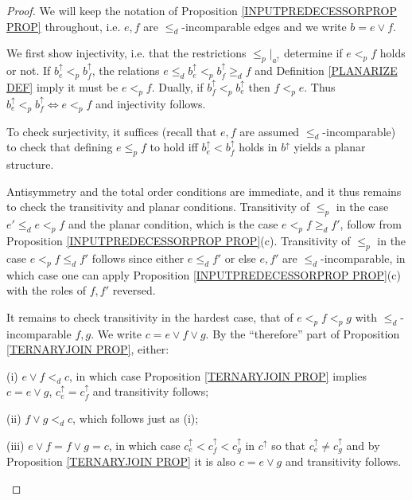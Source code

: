 \documentclass[a4paper,10pt
,draft
]{article}%
\numberwithin{equation}{section}
\numberwithin{figure}{section}
\theoremstyle{definition} %
\newcommand{\1}{\ensuremath{\mathbbm 1}}%
\begin{document}
\begin{proof}
We will keep the notation of Proposition \ref{INPUTPREDECESSORPROP PROP} throughout,
i.e. $e, f$ are $\leq_d$-incomparable edges and we write $b = e \vee f$. 

	We first show injectivity,
	i.e. that the restrictions $\leq_p|_{a^{\uparrow}}$ determine if 
	$e <_p f$ holds or not.
If $b^{\uparrow}_e <_p b^{\uparrow}_f$, the relations
$e \leq_d b^{\uparrow}_e <_p b^{\uparrow}_f \geq_d f$
and Definition \ref{PLANARIZE DEF} imply it must be $e <_p f$.
Dually, if $b^{\uparrow}_f <_p b^{\uparrow}_e$ then 
$f <_p e$. Thus 
$b^{\uparrow}_e <_p b^{\uparrow}_f \Leftrightarrow e <_p f$ and injectivity follows.

To check surjectivity, 
 it suffices (recall that $e,f$ are assumed $\leq_d$-incomparable) to check that
defining $e \leq_p f$ to hold iff $b^{\uparrow}_e < b^{\uparrow}_f$ holds in $b^{\uparrow}$ yields a planar structure.

Antisymmetry and the total order conditions are immediate, and it thus remains to check the transitivity and planar conditions.
Transitivity of $\leq_p$ in the case $e' \leq_d e <_p f$ and the planar condition, which is the case $e <_p f \geq_d f'$, follow from Proposition \ref{INPUTPREDECESSORPROP PROP}(c). Transitivity of $\leq_p$ in the case $e <_p f \leq_d f'$
follows since either $e \leq_d f'$ or else $e,f'$ are $\leq_d$-incomparable, in which case one can apply Proposition \ref{INPUTPREDECESSORPROP PROP}(c) with the roles of $f,f'$ reversed.

It remains to check transitivity in the hardest case, that of 
$e <_p f <_p g$ with $\leq_d$-incomparable $f,g$.
We write $c = e \vee f \vee g$.
By the ``therefore'' part of Proposition \ref{TERNARYJOIN PROP}, either:
\begin{inparaenum}
	\item[(i)] $e \vee f <_d c$, in which case 
	Proposition \ref{TERNARYJOIN PROP}
	implies 
	$c=e \vee g$,
	$c^{\uparrow}_e = c^{\uparrow}_f$ and transitivity follows;
	\item[(ii)] $f \vee g <_d c$, which follows just as (i);
	\item[(iii)]  
$e \vee f = f \vee g =c$, in which case 
$c^{\uparrow}_e <
c^{\uparrow}_f <
c^{\uparrow}_g $ in $c^{\uparrow}$
so that $c^{\uparrow}_e \neq c^{\uparrow}_g$ and by Proposition \ref{TERNARYJOIN PROP} it is also 
$c = e \vee g$ and transitivity follows.
\end{inparaenum}
\end{proof}
\end{document}
